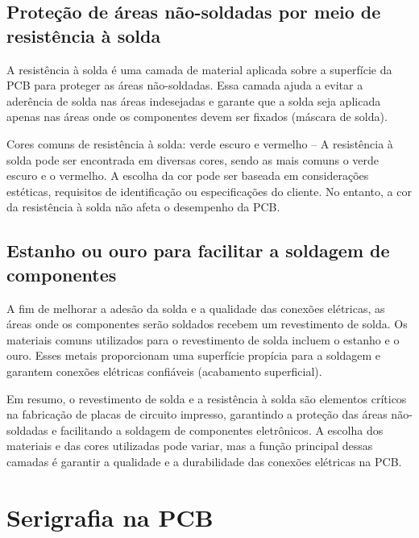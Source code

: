 \hypertarget{proteuxe7uxe3o-de-uxe1reas-nuxe3o-soldadas-por-meio-de-resistuxeancia-uxe0-solda}{%
\subsection{Proteção de áreas não-soldadas por meio de resistência à solda}\label{proteuxe7uxe3o-de-uxe1reas-nuxe3o-soldadas-por-meio-de-resistuxeancia-uxe0-solda}}

A resistência à solda é uma camada de material aplicada sobre a superfície da PCB para proteger as áreas não-soldadas. Essa camada ajuda a evitar a aderência de solda nas áreas indesejadas e garante que a solda seja aplicada apenas nas áreas onde os componentes devem ser fixados (máscara de solda).

Cores comuns de resistência à solda: verde escuro e vermelho -- A resistência à solda pode ser encontrada em diversas cores, sendo as mais comuns o verde escuro e o vermelho. A escolha da cor pode ser baseada em considerações estéticas, requisitos de identificação ou especificações do cliente. No entanto, a cor da resistência à solda não afeta o desempenho da PCB.

\hypertarget{estanho-ou-ouro-para-facilitar-a-soldagem-de-componentes}{%
\subsection{Estanho ou ouro para facilitar a soldagem de componentes}\label{estanho-ou-ouro-para-facilitar-a-soldagem-de-componentes}}

A fim de melhorar a adesão da solda e a qualidade das conexões elétricas, as áreas onde os componentes serão soldados recebem um revestimento de solda. Os materiais comuns utilizados para o revestimento de solda incluem o estanho e o ouro. Esses metais proporcionam uma superfície propícia para a soldagem e garantem conexões elétricas confiáveis (acabamento superficial).

Em resumo, o revestimento de solda e a resistência à solda são elementos críticos na fabricação de placas de circuito impresso, garantindo a proteção das áreas não-soldadas e facilitando a soldagem de componentes eletrônicos. A escolha dos materiais e das cores utilizadas pode variar, mas a função principal dessas camadas é garantir a qualidade e a durabilidade das conexões elétricas na PCB.

\hypertarget{serigrafia-na-pcb}{%
\section{Serigrafia na PCB}\label{serigrafia-na-pcb}}

